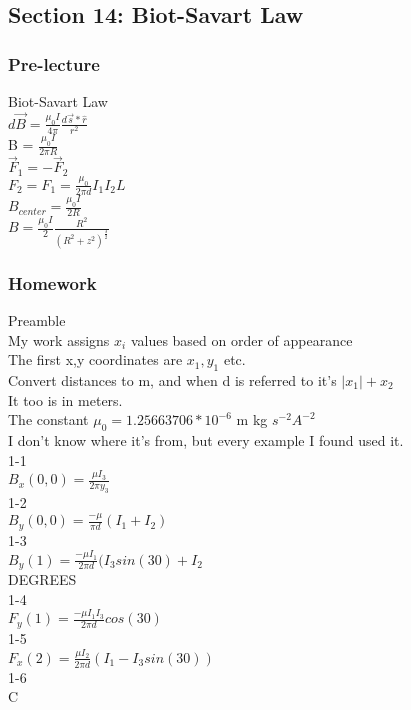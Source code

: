 \documentclass{article}
\begin{document}
\subsection{Section 14: Biot-Savart Law}
\subsubsection{Pre-lecture}
\noindent
Biot-Savart Law \\
$d\vec{B} = \frac{\mu_{0}I}{4 \pi} \frac{d\vec{s}*\hat{r}}{r^2}$ \\
B = $\frac{\mu_0 I}{2 \pi R}$ \\
$\vec{F}_1 = -\vec{F}_2$  \\
$F_2 = F_1 = \frac{\mu_0}{2 \pi d}I_1 I_2 L$ \\
$B_{center} = \frac{\mu_0 I}{2R}$ \\
$B = \frac{\mu_0 I}{2} \frac{R^2}{(R^2+z^2)^{\frac{3}{2}}}$

\subsubsection{Homework}
\noindent
Preamble \\
My work assigns $x_i$ values based on order of appearance \\
The first x,y coordinates are $x_1,y_1$ etc. \\
Convert distances to m, and when d is referred to it's $\vert x_1 \vert + x_2 $ \\
It too is in meters. \\
The constant $\mu_0 = 1.25663706 * 10^{-6}$ m kg $s^{-2} A^{-2}$ \\
I don't know where it's from, but every example I found used it. \\
1-1 \\
$B_x(0,0) = \frac{\mu I_3}{2 \pi y_3}$ \\
1-2 \\
$B_y(0,0) = \frac{-\mu}{\pi d}(I_1 + I_2)$ \\
1-3 \\
$B_y(1) = \frac{- \mu I_1}{2 \pi d}(I_3 sin(30) + I_2$ \\
DEGREES \\
1-4 \\
$F_y(1) = \frac{- \mu I_1 I_3}{2 \pi d}cos(30)$ \\
1-5 \\
$F_x(2) = \frac{\mu I_2}{2 \pi d}(I_1 - I_3 sin(30))$ \\
1-6 \\
C
\end{document}
